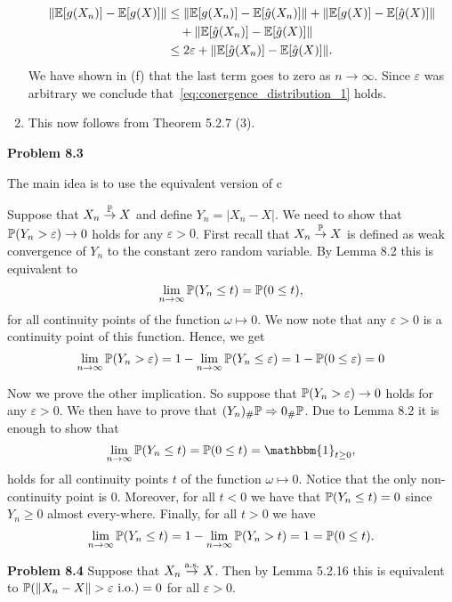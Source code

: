 \begin{enumerate}[label={(\alph*)}]
\begin{align*}
	\|\mathbb E[g(X_n)] - \mathbb E[g(X)]\| &\le \|\mathbb E[g(X_n)] - \mathbb E[\hat{g}(X_n)]\| 
		+ \|\mathbb E[g(X)] - \mathbb E[\hat{g}(X)]\| \\
	&\hspace{10pt}+ \|\mathbb E[\hat{g}(X_n)] - \mathbb E[\hat{g}(X)]\|\\
	&\le 2\varepsilon + \|\mathbb E[\hat{g}(X_n)] - \mathbb E[\hat{g}(X)]\|.
\end{align*}
We have shown in (f) that the last term goes to zero as $n \to \infty$. Since $\varepsilon$ was arbitrary we conclude that~\eqref{eq:conergence_distribution_1} holds.
\item This now follows from Theorem 5.2.7 (3).
\end{enumerate}

\bigskip

\textbf{Problem 8.3}

The main idea is to use the equivalent version of c

Suppose that $X_n \stackrel{\mathbb P}{\rightarrow} X$ and define $Y_n = |X_n - X|$. We need to show that $\mathbb P(Y_n > \varepsilon) \to 0$ holds for any $\varepsilon > 0$. First recall that $X_n \stackrel{\mathbb P}{\rightarrow} X$ is defined as weak convergence of $Y_n$ to the constant zero random variable. By Lemma 8.2 this is equivalent to 
\[
	\lim_{n \to \infty} \mathbb P(Y_n \le t) = \mathbb P(0 \le t),
\]
for all continuity points of the function $\omega \mapsto 0$. We now note that any $\varepsilon > 0$ is a continuity point of this function. Hence, we get
\[
	\lim_{n \to \infty} \mathbb P(Y_n > \varepsilon) = 1 - \lim_{n \to \infty} \mathbb P(Y_n \le \varepsilon) = 1 - \mathbb P(0 \le \varepsilon) = 0
\]

Now we prove the other implication. So suppose that $\mathbb P(Y_n > \varepsilon) \to 0$ holds for any $\varepsilon > 0$. We then have to prove that $(Y_n)_\# \mathbb P \Rightarrow 0_\# \mathbb P$. Due to Lemma 8.2 it is enough to show that
\[
	\lim_{n \to \infty} \bbP(Y_n \le t) = \bbP(0 \le t) = \mathbbm{1}_{t \ge 0},
\]
holds for all continuity points $t$ of the function $\omega \mapsto 0$. Notice that the only non-continuity point is $0$. Moreover, for all $t < 0$ we have that $\mathbb P(Y_n \le t) = 0$ since $Y_n \ge 0$ almost every-where. Finally, for all $t > 0$ we have
\[
	\lim_{n \to \infty} \mathbb P(Y_n \le t) = 1 - \lim_{n \to \infty} \mathbb P(Y_n > t) = 1 = \mathbb P(0 \le t). 
\]

\bigskip

\textbf{Problem 8.4}
Suppose that $X_n \stackrel{\mathrm{a.s.}}{\rightarrow} X$. Then by Lemma 5.2.16 this is equivalent to $\mathbb P(\|X_n - X\| > \varepsilon \text{ i.o.}) = 0$ for all $\varepsilon > 0$. 

